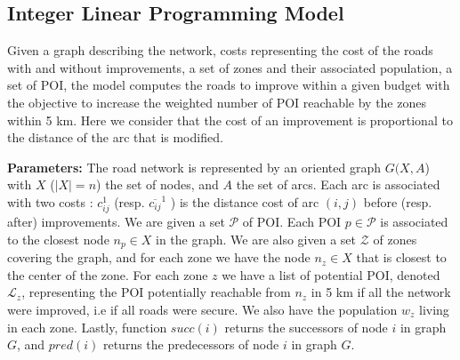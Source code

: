 \subsection*{Integer Linear Programming Model}\label{annexe:modeleexact}

Given a graph describing the network, costs representing the cost of the roads with and without improvements, a set of zones and their associated population, a set of POI, the model computes the roads to improve within a given budget with the objective to increase the weighted number of POI reachable by the zones within 5 km. Here we consider that the cost of an improvement is proportional to the distance of the arc that is modified. 


\textbf{Parameters:} The road network is represented by an oriented graph $G(X,A$) with $X$ ($|X|=n$) the set of nodes, and $A$ the set of arcs. Each arc is associated with two costs : $c_{ij}^1$ (resp. $\overline{c_{ij}}^1$ ) is the distance cost of arc $(i,j)$ before (resp. after) improvements. We are given a set $\mathcal{P}$ of POI. Each POI $p \in \mathcal{P}$ is associated to the closest node $n_p \in X$ in the graph. We are also given a set $\mathcal{Z}$ of zones covering the graph, and for each zone we have the node $n_z \in X$ that is closest to the center of the zone. For each zone $z$ we have a list of potential POI, denoted $\mathcal{L}_z$, representing the POI potentially reachable from $n_z$ in 5 km if all the network were improved, i.e if all roads were secure. We also have the population $w_z$ living in each zone. Lastly, function $succ(i)$ returns the successors of node $i$ in graph $G$, and $pred(i)$ returns the predecessors of node $i$ in graph $G$.
 \\



